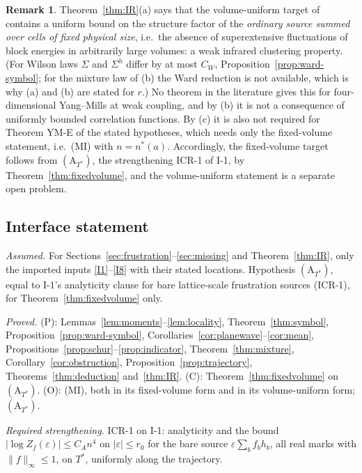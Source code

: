 \documentclass[11pt]{article}
\theoremstyle{definition}
\newtheorem{remark}[theorem]{Remark}
\begin{document}
\begin{remark}
Theorem~\ref{thm:IR}(a) says that the volume-uniform target of \cite{cur} contains a uniform bound on the structure
factor of the \emph{ordinary source summed over cells of fixed physical size}, i.e.\ the absence of superextensive
fluctuations of block energies in arbitrarily large volumes: a weak infrared clustering property. (For Wilson laws
$\Sigma$ and $\Sigma^h$ differ by at most $C_W$, Proposition~\ref{prop:ward-symbol}; for the mixture law of (b) the
Ward reduction is not available, which is why (a) and (b) are stated for $r$.) No theorem in the literature gives this for
four-dimensional Yang--Mills at weak coupling, and by (b) it is not a consequence of uniformly bounded correlation
functions. By (c) it is also not required for Theorem YM-E of the stated hypotheses, which needs only the fixed-volume
statement, i.e.\ (MI) with $n=n^*(a)$. Accordingly, the fixed-volume target follows from
$(\mathrm A_{T^*})$, the strengthening ICR-1 of I-1, by Theorem~\ref{thm:fixedvolume}, and the
volume-uniform statement is a separate open problem.
\end{remark}

\subsection{Interface statement}

\emph{Assumed.} For Sections~\ref{sec:frustration}--\ref{sec:missing} and
Theorem~\ref{thm:IR}, only the imported inputs \ref{I1}--\ref{I8} with their stated locations. Hypothesis
$(\mathrm A_{T^*})$, equal to I-1's analyticity clause for bare lattice-scale frustration sources (ICR-1), for
Theorem~\ref{thm:fixedvolume} only.

\emph{Proved.} (P): Lemmas~\ref{lem:moments}--\ref{lem:locality}, Theorem~\ref{thm:symbol},
Proposition~\ref{prop:ward-symbol}, Corollaries~\ref{cor:planewave}--\ref{cor:mean},
Propositions~\ref{prop:schur}--\ref{prop:indicator}, Theorem~\ref{thm:mixture}, Corollary~\ref{cor:obstruction},
Proposition~\ref{prop:trajectory}, Theorems~\ref{thm:deduction} and~\ref{thm:IR}. (C): Theorem~\ref{thm:fixedvolume}
on $(\mathrm A_{T^*})$. (O): (MI), both in its fixed-volume form and in its volume-uniform form; $(\mathrm A_{T^*})$.

\emph{Required strengthening.} ICR-1 on I-1: analyticity and the bound $|\log Z_f(\varepsilon)|\le C_An^4$ on
$|\varepsilon|\le r_0$ for the bare source $\varepsilon\sum_bf_bh_b$, all real marks with $\|f\|_\infty\le1$, on $T^*$,
uniformly along the trajectory.
\end{document}
